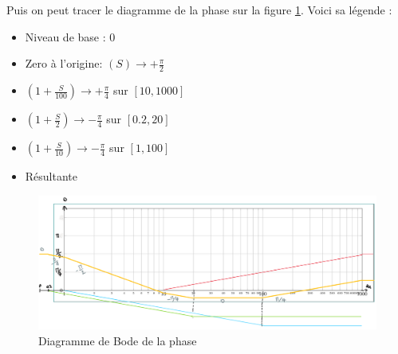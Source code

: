 \documentclass{article}
\theoremstyle{plain}%
\theoremstyle{definition}
\theoremstyle{remark}
\begin{document}
Puis on peut tracer le diagramme de la phase sur la figure \ref{BodePhase}. Voici sa légende : 
\begin{itemize}
    \item \color{black} Niveau de base : 0 \color{orange}
    \item Zero à l'origine: $ (S) \rightarrow +\frac{\pi}{2}$ \color{red}
    \item $ (1 + \frac{S}{100}) \rightarrow +\frac{\pi}{4}$ sur $ [10,1000] $ \color{green}
    \item $ (1 + \frac{S}{2}) \rightarrow -\frac{\pi}{4}$ sur $ [0.2,20] $ \color{blue}
    \item $ (1 + \frac{S}{10}) \rightarrow -\frac{\pi}{4}$ sur $ [1,100] $ \color{yellow}
    \item Résultante \color{black}
\end{itemize}

\begin{figure}[htbp]
    \centering
    \includegraphics*[width=\textwidth]{./phase.png}
    \caption{Diagramme de Bode de la phase}
    \label{BodePhase}
\end{figure}
\end{document}
